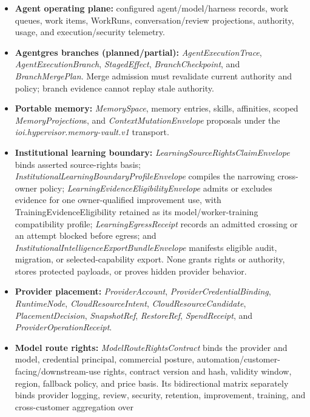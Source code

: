 \documentclass[
  11pt,
]{article}
\begin{document}
\begin{itemize}
  executable \emph{OntologyActionContract} bindings. Local canonicality,
  mapping ambiguity, uncertainty, contradiction, supersession, and dispute
  remain explicit.
\item
  \textbf{Agent operating plane:} configured agent/model/harness records,
  work queues, work items, WorkRuns, conversation/review projections,
  authority, usage, and execution/security telemetry.
\item
  \textbf{Agentgres branches (planned/partial):}
  \emph{AgentExecutionTrace}, \emph{AgentExecutionBranch},
  \emph{StagedEffect}, \emph{BranchCheckpoint}, and
  \emph{BranchMergePlan}. Merge admission must revalidate current
  authority and policy; branch evidence cannot replay stale authority.
\item
  \textbf{Portable memory:} \emph{MemorySpace}, memory entries, skills,
  affinities, scoped \emph{MemoryProjection}s, and
  \emph{ContextMutationEnvelope} proposals under the
  \emph{ioi.hypervisor.memory-vault.v1} transport.
\item
  \textbf{Institutional learning boundary:}
  \emph{LearningSourceRightsClaimEnvelope} binds asserted source-rights basis;
  \emph{InstitutionalLearningBoundaryProfileEnvelope} compiles the narrowing
  cross-owner policy; \emph{LearningEvidenceEligibilityEnvelope} admits or
  excludes evidence for one owner-qualified improvement use, with
  TrainingEvidenceEligibility retained as its model/worker-training
  compatibility profile; \emph{LearningEgressReceipt} records an admitted
  crossing or an attempt blocked before egress; and
  \emph{InstitutionalIntelligenceExportBundleEnvelope} manifests eligible
  audit, migration, or selected-capability export. None grants rights or
  authority, stores protected payloads, or proves hidden provider behavior.
\item
  \textbf{Provider placement:} \emph{ProviderAccount},
  \emph{ProviderCredentialBinding}, \emph{RuntimeNode},
  \emph{CloudResourceIntent}, \emph{CloudResourceCandidate},
  \emph{PlacementDecision}, \emph{SnapshotRef}, \emph{RestoreRef},
  \emph{SpendReceipt}, and \emph{ProviderOperationReceipt}.
\item
  \textbf{Model route rights:} \emph{ModelRouteRightsContract} binds the
  provider and model, credential principal, commercial posture,
  automation/customer-facing/downstream-use rights, contract version and
  hash, validity window, region, fallback policy, and price basis. Its
  bidirectional matrix separately binds provider logging, review, security,
  retention, improvement, training, and cross-customer aggregation over

\end{itemize}
\end{document}
